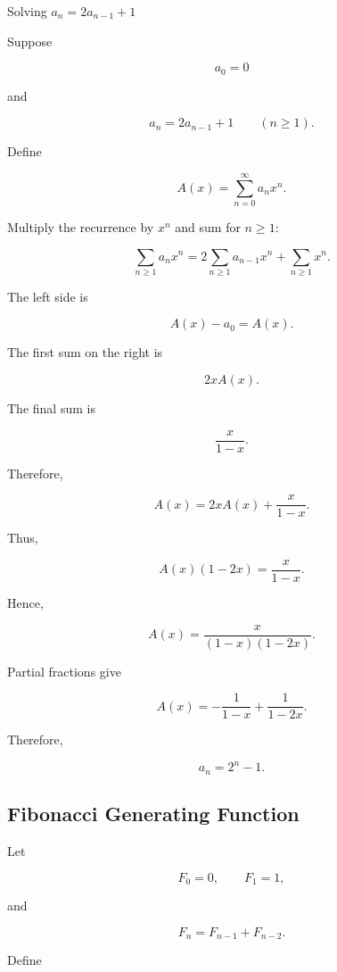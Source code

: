 \begin{workedexamplebox}{Solving \(a_n=2a_{n-1}+1\)}

Suppose

\[
a_0=0
\]

and

\[
a_n=2a_{n-1}+1
\qquad
(n\geq1).
\]

Define

\[
A(x)
=
\sum_{n=0}^{\infty}a_nx^n.
\]

Multiply the recurrence by \(x^n\) and sum for \(n\geq1\):

\[
\sum_{n\geq1}a_nx^n
=
2\sum_{n\geq1}a_{n-1}x^n
+
\sum_{n\geq1}x^n.
\]

The left side is

\[
A(x)-a_0=A(x).
\]

The first sum on the right is

\[
2xA(x).
\]

The final sum is

\[
\frac{x}{1-x}.
\]

Therefore,

\[
A(x)
=
2xA(x)
+
\frac{x}{1-x}.
\]

Thus,

\[
A(x)(1-2x)
=
\frac{x}{1-x}.
\]

Hence,

\[
A(x)
=
\frac{x}{(1-x)(1-2x)}.
\]

Partial fractions give

\[
A(x)
=
-\frac{1}{1-x}
+
\frac{1}{1-2x}.
\]

Therefore,

\begin{answerbox}
\[
\boxed{
a_n=2^n-1.
}
\]
\end{answerbox}

\end{workedexamplebox}

\subsection{Fibonacci Generating Function}
\label{subsec:fibonacci-generating-function}

Let

\[
F_0=0,
\qquad
F_1=1,
\]

and

\[
F_n=F_{n-1}+F_{n-2}.
\]

Define

